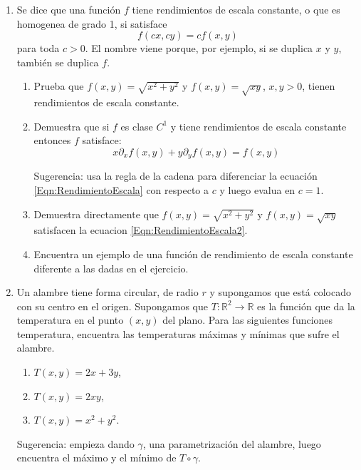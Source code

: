 \documentclass{article}
\theoremstyle{definition}
\begin{document}
\begin{enumerate}
\item Se dice que una funci\'on $f$ tiene rendimientos de escala constante,
  o que es homogenea de grado 1, si satisface
  \begin{equation}\label{Eqn:RendimientoEscala}
  f(cx,cy)=cf(x,y)
  \end{equation}
  para toda $c>0$. El nombre viene porque, por ejemplo,
  si se duplica $x$ y $y$, tambi\'en se duplica $f$.

  \begin{enumerate}
  \item Prueba que $f(x,y)=\sqrt{x^2+y^2}$ y  $f(x,y)=\sqrt{xy}$, $x,y>0$,
    tienen rendimientos de escala constante.
  \item Demuestra que si $f$ es clase $C^1$ y tiene rendimientos
    de escala constante entonces $f$ satisface:
    \begin{equation}\label{Eqn:RendimientoEscala2}
    x \partial_x f(x,y) + y \partial_y f(x,y)=f(x,y)
    \end{equation}

    Sugerencia: usa la regla de la cadena para
    diferenciar la ecuaci\'on \eqref{Eqn:RendimientoEscala}
    con respecto a $c$ y luego evalua en $c=1$.

  \item Demuestra directamente que $f(x,y)=\sqrt{x^2+y^2}$ y $f(x,y)=\sqrt{xy}$
    satisfacen la ecuacion \eqref{Eqn:RendimientoEscala2}.

  \item Encuentra un ejemplo de una funci\'on de rendimiento de escala
    constante diferente a las dadas en el ejercicio.
  \end{enumerate}
  
\item Un alambre tiene forma circular, de radio $r$ y supongamos que est\'a
  colocado con su centro en el origen. Supongamos que
  $T:\mathbb{R}^2 \to \mathbb{R}$ es la funci\'on que da la temperatura en
  el punto $(x,y)$ del plano. Para las siguientes funciones
  temperatura, encuentra las temperaturas m\'aximas y m\'inimas
  que sufre el alambre.

  \begin{enumerate}
  \item $T(x,y)=2x+3y$,
  \item $T(x,y)=2xy$,
  \item $T(x,y)=x^2+y^2$.
  \end{enumerate}

  Sugerencia: empieza dando $\gamma$, una parametrizaci\'on del alambre,
  luego encuentra el m\'aximo y el m\'inimo de $T\circ \gamma$.
  

\end{enumerate}
\end{document}
